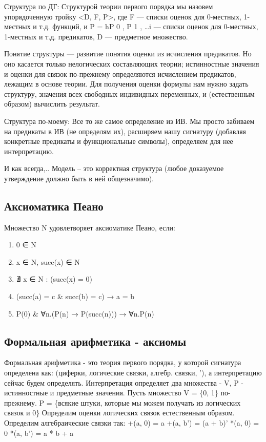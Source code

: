 \documentclass[11pt]{article}
\begin{document}
Структура по ДГ:
Структурой теории первого порядка мы назовем упорядоченную тройку
<D, F, P>, где F — списки оценок для 0-местных, 1-местных и т.д.
функций, и P = hP 0 , P 1 , \ldots{}i — списки оценок для 0-местных,
1-местных и т.д. предикатов, D — предметное множество.

Понятие структуры — развитие понятия оценки из исчисления предикатов.
Но оно касается только нелогических составляющих теории; истинностные
значения и оценки для связок по-прежнему определяются исчислением
предикатов, лежащим в основе теории. Для получения оценки формулы
нам нужно задать структуру, значения всех свободных индивидных
переменных, и (естественным образом) вычислить результат.

Структура по-моему:
Все то же самое определение из ИВ. Мы просто забиваем на предикаты
в ИВ (не определям их), расширяем нашу сигнатуру (добавляя конкретные
предикаты и функциональные символы), определяем для нее интерпретацию.

И как всегда,..
Модель – это корректная структура (любое доказуемое утверждение должно
быть в ней общезначимо).
\subsection{Аксиоматика Пеано}
\label{sec-2-19}
Множество N удовлетворяет аксиоматике Пеано, если:
\begin{enumerate}
\item 0 ∈ N
\item x ∈ N, succ(x) ∈ N
\item ∄ x ∈ N : (succ(x) = 0)
\item (succ(a) = c \& succ(b) = c) → a = b
\item P(0) \& ∀n.(P(n) → P(succ(n))) → ∀n.P(n)
\end{enumerate}
\subsection{Формальная арифметика - аксиомы}
\label{sec-2-20}
Формальная арифметика - это теория первого порядка, у которой
сигнатура определена как: (циферки, логические связки, алгебр.
связки, '), а интерпретацию сейчас будем определять.
Интерпретация определяет два множества - V, P - истинностные и
предметные значения. Пусть множество V = \{0, 1\} по-прежнему.
P = \{всякие штуки, которые мы можем получать из логических связок и 0\}
Определим оценки логических связок естественным образом.
Определим алгебраические связки так:
+(a, 0) = a
+(a, b') = (a + b)'
*(a, 0) = 0
*(a, b') = a * b + a
\end{document}
